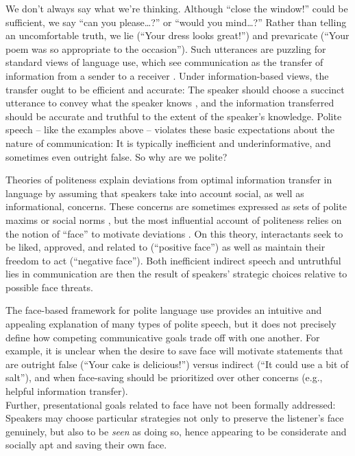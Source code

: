 \documentclass[12pt]{article}
\begin{document}

We don't always say what we're thinking. Although \enquote{close the
window!} could be sufficient, we say \enquote{can you please\ldots{}?}
or \enquote{would you mind\ldots{}?} Rather than telling an
uncomfortable truth, we lie (\enquote{Your dress looks great!}) and
prevaricate (\enquote{Your poem was so appropriate to the occasion}).
Such utterances are puzzling for standard views of language use, which
see communication as the transfer of information from a sender to a
receiver \cite{buhler1934, shannon1948, jakobson1960, frank2012}. Under
information-based views, the transfer ought to be efficient and
accurate: The speaker should choose a succinct utterance  to convey
what the speaker knows \cite{grice1975, searle1975},
and the information transferred should be accurate and truthful 
to the extent of the speaker's knowledge. Polite speech --
like the examples above -- violates these basic expectations about the
nature of communication: It is typically inefficient and
underinformative, and sometimes even outright false. So why are we
polite?

Theories of politeness explain deviations from optimal information
transfer in language by assuming that speakers take into account social,
as well as informational, concerns. These concerns are sometimes
expressed as sets of polite maxims \cite{leech1983} or social norms \cite{ide1989}, 
but the most influential account of politeness relies on the
notion of \enquote{face} to motivate deviations \cite{brown1987, goffman1967}. 
On this theory, interactants seek to be liked,
approved, and related to (\enquote{positive face}) as well as maintain
their freedom to act (\enquote{negative face}).
Both inefficient indirect speech and untruthful lies in communication
are then the result of speakers' strategic choices relative to possible
face threats.

The face-based framework for polite language use provides an intuitive
and appealing explanation of many types of polite speech, but it does
not precisely define how competing communicative goals trade off with
one another. For example, it is unclear when the desire to save face
will motivate statements that are outright false (\enquote{Your cake is
delicious!}) versus indirect (\enquote{It could use a bit of salt}), and
when face-saving should be prioritized over other concerns (e.g.,
helpful information transfer).\\
Further, presentational goals related to face have not been formally
addressed: Speakers may choose particular strategies not only to
preserve the listener's face genuinely, but also to be \emph{seen} as
doing so, hence appearing to be considerate and socially apt and saving
their own face.
\end{document}
